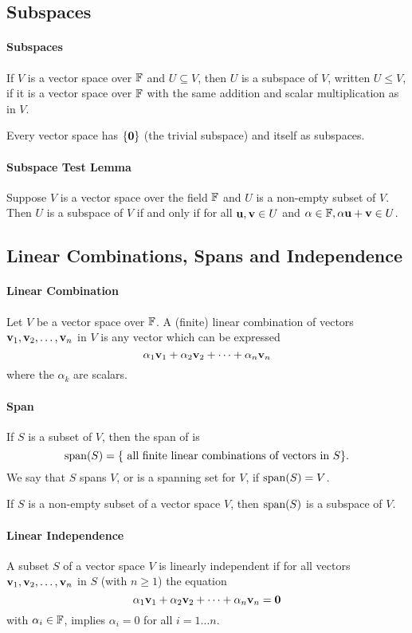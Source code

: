 \subsection{Subspaces}
\paragraph{Subspaces} 
If \(V\) is a vector space over \(\mathbb{F}\) and \(U \subseteq V\), then \(U\) is a subspace of \(V\), written \(U \leq V\), if it is a vector space over \(\mathbb{F}\) with the same addition and scalar multiplication as in \(V\).

Every vector space has \(\{\mathbf{0}\}\) (the trivial subspace) and itself as subspaces.

\paragraph{Subspace Test Lemma}
Suppose \(V\) is a vector space over the field \(\mathbb{F}\) and \(U\) is a non-empty subset of \(V\). Then \(U\) is a subspace of \(V\) if and only if for all \(\mathbf{u}, \mathbf{v} \in U\) and \(\alpha \in \mathbb{F}, \alpha\mathbf{u} + \mathbf{v} \in U\).

\subsection{Linear Combinations, Spans and Independence}
\paragraph{Linear Combination}
Let \(V\) be a vector space over \(\mathbb{F}\). A (finite) linear combination of vectors \(\mathbf{v}_1, \mathbf{v}_2, \dots, \mathbf{v}_n\) in \(V\) is any vector which can be expressed 
\[\alpha_1\mathbf{v}_1 + \alpha_2\mathbf{v}_2 + \cdots + \alpha_n\mathbf{v}_n\]
where the \(\alpha_k\) are scalars.

\paragraph{Span} 
If \(S\) is a subset of \(V\), then the span of is
\[\mathrm{span}(S) = \{ \text{ all finite linear combinations of vectors in } S \}.\]
We say that \(S\) spans \(V\), or is a spanning set for \(V\), if \(\mathrm{span}(S) = V\).

If \(S\) is a non-empty subset of a vector space \(V\), then \(\mathrm{span}(S)\) is a subspace of \(V\).

\paragraph{Linear Independence}
A subset \(S\) of a vector space \(V\) is linearly independent if for all vectors \(\mathbf{v}_1, \mathbf{v}_2, \dots, \mathbf{v}_n\) in \(S\) (with \(n \geq 1\)) the equation
\[\alpha_1\mathbf{v}_1 + \alpha_2\mathbf{v}_2 + \cdots + \alpha_n\mathbf{v}_n = \mathbf{0}\]
with \(\alpha_i \in \mathbb{F}\), implies \(\alpha_i = 0\) for all \(i = 1 \dots n\).


